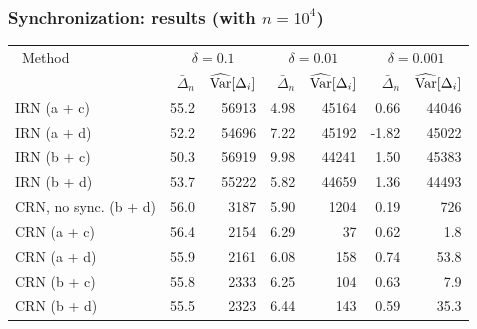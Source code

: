 \documentclass[t,usepdftitle=false,aspectratio=169]{beamer}
\begin{document}
\begin{frame}
	\frametitle{Synchronization: results (with ${n=10^4}$)}
	
	\begin{footnotesize}
		\begin{center}
			\begin{tabular}{|l|rr|rr|rr|}
				\hline
				\ Method
				& \multicolumn{2}{|c}{$\delta = 0.1$}
				& \multicolumn{2}{|c}{$\delta = 0.01$}
				& \multicolumn{2}{|c|}{$\delta = 0.001$} \\
				& $\bar \Delta_n$ & $\widehat{\operatorname{Var}}[\Delta_i]$
				& $\bar \Delta_n$ & $\widehat{\operatorname{Var}}[\Delta_i]$
				& $\bar \Delta_n$ & $\widehat{\operatorname{Var}}[\Delta_i]$\\
				\hline
				IRN (a + c)                      &  55.2 & 56913 &  4.98 & 45164 &  0.66 & 44046 \\
				IRN (a + d)                      &  52.2 & 54696 &  7.22 & 45192 & -1.82 & 45022 \\
				IRN (b + c)                      &  50.3 & 56919 &  9.98 & 44241 &  1.50 & 45383 \\
				IRN (b + d)                      &  53.7 & 55222 &  5.82 & 44659 &  1.36 & 44493 \\
				CRN, no sync. (b + d)            &  56.0 &  3187 &  5.90 &  1204 &  0.19 &   726 \\
				CRN (a + c)                      &  56.4 &  2154 &  6.29 &    37 &  0.62 &   1.8 \\
				CRN (a + d)                      &  55.9 &  2161 &  6.08 &   158 &  0.74 &  53.8 \\
				CRN (b + c)                      &  55.8 &  2333 &  6.25 &   104 &  0.63 &   7.9 \\
				CRN (b + d)                      &  55.5 &  2323 &  6.44 &   143 &  0.59 &  35.3 \\
				\hline
			\end{tabular}
		\end{center}
	\end{footnotesize}
	
\end{frame}
\end{document}

